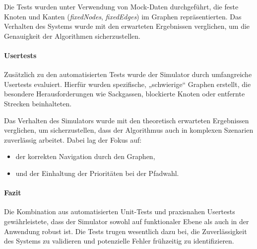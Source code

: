 \documentclass[main.tex]{subfiles} %
\begin{document}
Die Tests wurden unter Verwendung von Mock-Daten durchgeführt, die feste Knoten und Kanten (\textit{fixedNodes}, \textit{fixedEdges}) im Graphen repräsentierten. Das Verhalten des Systems wurde mit den erwarteten Ergebnissen verglichen, um die Genauigkeit der Algorithmen sicherzustellen.

\paragraph{Usertests}

Zusätzlich zu den automatisierten Tests wurde der Simulator durch umfangreiche Usertests evaluiert. Hierfür wurden spezifische, „schwierige“ Graphen erstellt, die besondere Herausforderungen wie Sackgassen, blockierte Knoten oder entfernte Strecken beinhalteten. 

Das Verhalten des Simulators wurde mit den theoretisch erwarteten Ergebnissen verglichen, um sicherzustellen, dass der Algorithmus auch in komplexen Szenarien zuverlässig arbeitet. Dabei lag der Fokus auf:
\begin{itemize}
    \item der korrekten Navigation durch den Graphen,
    \item und der Einhaltung der Prioritäten bei der Pfadwahl.
\end{itemize}

\paragraph{Fazit}

Die Kombination aus automatisierten Unit-Tests und praxisnahen Usertests gewährleistete, dass der Simulator sowohl auf funktionaler Ebene als auch in der Anwendung robust ist. Die Tests trugen wesentlich dazu bei, die Zuverlässigkeit des Systems zu validieren und potenzielle Fehler frühzeitig zu identifizieren.
\end{document}
